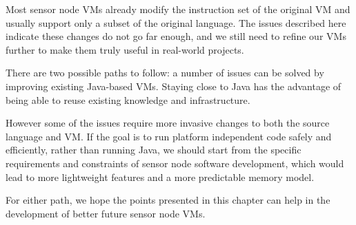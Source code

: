 Most sensor node VMs already modify the instruction set of the original VM and usually support only a subset of the original language. The issues described here indicate these changes do not go far enough, and we still need to refine our VMs further to make them truly useful in real-world projects.

There are two possible paths to follow: a number of issues can be solved by improving existing Java-based VMs. Staying close to Java has the advantage of being able to reuse existing knowledge and infrastructure.

However some of the issues require more invasive changes to both the source language and VM. If the goal is to run platform independent code safely and efficiently, rather than running Java, we should start from the specific requirements and constraints of sensor node software development, which would lead to more lightweight features and a more predictable memory model.

For either path, we hope the points presented in this chapter can help in the development of better future sensor node VMs.
